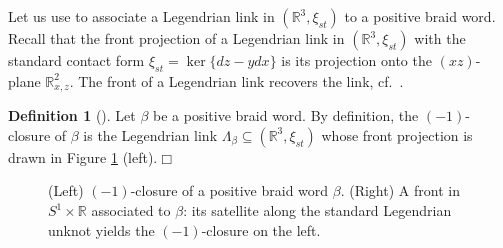 \documentclass[10pt]{amsart}
\theoremstyle{plain}
\theoremstyle{definition}
\newtheorem{definition}[thm]{Definition}
\theoremstyle{remark}
\numberwithin{equation}{section}
\newcommand{\R}{\mathbb{R}}
\newcommand{\sse}{\subseteq}
\newcommand{\bR}{\mathbb{R}}
\begin{document}
\noindent Let us use \cite[Section 2.2]{CasalsNg} to associate a Legendrian link in $(\R^{3},\xi_{st})$ to a positive braid word. Recall that the front projection of a Legendrian link in $(\R^{3},\xi_{st})$ with the standard contact form $\xi_{st}=\ker\{dz-ydx\}$ is its projection onto the $(xz)$-plane $\R^2_{x,z}$. The front of a Legendrian link recovers the link, cf.~\cite[Section 3.2]{Geiges08}.

\begin{definition}[\cite{CasalsNg}]\label{defn: -1 closure} Let $\beta$ be a positive braid word. By definition, the $(-1)$-closure of $\beta$ is the Legendrian link  $\Lambda_\beta\sse(\bR^3,\xi_{st})$ whose front projection is drawn in Figure \ref{fig:-1 closure of a positive braid} (left).\hfill$\Box$
\end{definition}

\begin{figure}[H]
    \centering
    \hspace{2cm}
    \caption{(Left) $(-1)$-closure of a positive braid word $\beta$. (Right) A front in $S^1\times\R$  associated to $\beta$: its satellite along the standard Legendrian unknot yields the $(-1)$-closure on the left.}
    \label{fig:-1 closure of a positive braid}
\end{figure}
\end{document}

